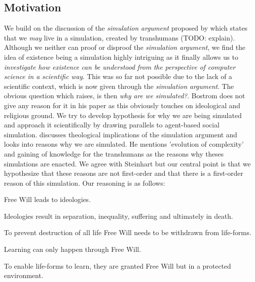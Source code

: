 \documentclass{article}
\begin{document}
\subsection{Motivation}
We build on the discussion of the \textit{simulation argument} proposed by \cite{bostrom_are_2003} which states that we \textit{may} live in a simulation, created by transhumans (TODO: explain). Although we neither can proof or disproof the \textit{simulation argument}, we find the idea of existence being a simulation highly intriguing as it finally allows us to \textit{investigate how existence can be understood from the perspective of computer science in a scientific way}. This was so far not possible due to the lack of a scientific context, which is now given through the \textit{simulation argument}. The obvious question which raises, is then \textit{why are we simulated?}. Bostrom does not give any reason for it in his paper as this obviously touches on ideological and religious ground. We try to develop hypothesis for why we are being simulated and approach it scientifically by drawing parallels to agent-based social simulation.
\cite{steinhart_theological_2010} discusses theological implications of the simulation argument and looks into reasons why we are simulated. He mentions 'evolution of complexity' and gaining of knowledge for the transhumans as the reasons why theses simulations are enacted. We agree with Steinhart but our central point is that we hypothesize that these reasons are not first-order and that there is a first-order reason of this simulation. Our reasoning is as follows:

\begin{theorem}
Free Will leads to ideologies.
\end{theorem}

\begin{theorem}
Ideologies result in separation, inequality, suffering and ultimately in death.
\end{theorem}

\begin{theorem}
To prevent destruction of all life Free Will needs to be withdrawn from life-forms.
\end{theorem}

\begin{theorem}
Learning can only happen through Free Will.
\end{theorem}

\begin{theorem}
To enable life-forms to learn, they are granted Free Will but in a protected environment.
\end{theorem}
\end{document}

